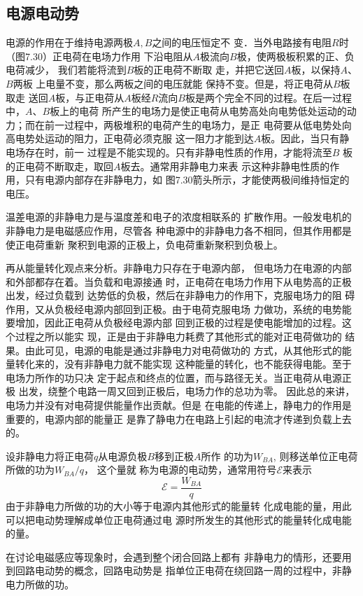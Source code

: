 \subsection{电源电动势}
电源的作用在于维持电源两极$A,B$之间的电压恒定不
变．当外电路接有电阻$R$时（图7.30）正电荷在电场力作用
下沿电阻从$A$极流向$B$极，使两极板积累的正、负电荷减少，
我们若能将流到$B$板的正电荷不断取
走，并把它送回$A$板，以保持$A$、$B$两板
上电量不变，那么两板之间的电压就能
保持不变。但是，将正电荷从$B$板取走
送回$A$板，与正电荷从$A$板经$R$流向$B$板是两个完全不同的过程。在后一过程中，$A$、$B$板上的电荷
所产生的电场力是使正电荷从电势高处向电势低处运动的动
力；而在前一过程中，两极堆积的电荷产生的电场力，是正
电荷要从低电势处向高电势处运动的阻力，正电荷必须克服
这一阻力才能到达$A$板。因此，当只有静电场存在时，前一
过程是不能实现的。只有非静电性质的作用，才能将流至$B$
板的正电荷不断取走，取回$A$板去。通常用非静电力来表
示这种非静电性质的作用，只有电源内部存在非静电力，如
图7.30箭头所示，才能使两极间维持恒定的电压。

温差电源的非静电力是与温度差和电子的浓度相联系的
扩散作用。一般发电机的非静电力是电磁感应作用，尽管各
种电源中的非静电力各不相同，但其作用都是使正电荷重新
聚积到电源的正极上，负电荷重新聚积到负极上。

再从能量转化观点来分析。非静电力只存在于电源内部，
但电场力在电源的内部和外部都存在着。当负载和电源接通
时，正电荷在电场力作用下从电势高的正极出发，经过负载到
达势低的负极，然后在非静电力的作用下，克服电场力的阻
碍作用，又从负极经电源内部回到正极。由于电荷克服电场
力做功，系统的电势能要增加，因此正电荷从负极经电源内部
回到正极的过程是使电能增加的过程。这个过程之所以能实
现，正是由于非静电力耗费了其他形式的能对正电荷做功的
结果。由此可见，电源的电能是通过非静电力对电荷做功的
方式，从其他形式的能量转化来的，没有非静电力就不能实现
这种能量的转化，也不能获得电能。至于电场力所作的功只决
定于起点和终点的位置，而与路径无关。当正电荷从电源正极
出发，绕整个电路一周又回到正极后，电场力作的总功为零。
因此总的来讲，电场力并没有对电荷提供能量作出贡献。但是
在电能的传递上，静电力的作用是重要的，电源内部的能量正
是靠了静电力在电路上引起的电流才传递到负载上去的。

设非静电力将正电荷$q$从电源负极$B$移到正极$A$所作
的功为$W_{BA}$, 则移送单位正电荷所做的功为$W_{BA}/q$，
这个量就
称为电源的电动势，通常用符号$\mathcal{E}$来表示
\[\mathcal{E}=\frac{W_{BA}}{q}\]
由于非静电力所做的功的大小等于电源内其他形式的能量转
化成电能的量，用此可以把电动势理解成单位正电荷通过电
源时所发生的其他形式的能量转化成电能的量。

在讨论电磁感应等现象时，会遇到整个闭合回路上都有
非静电力的情形，还要用到回路电动势的概念，回路电动势是
指单位正电荷在绕回路一周的过程中，非静电力所做的功。

